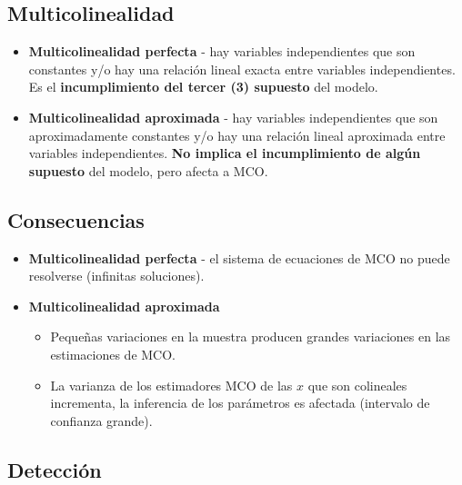 \documentclass[10pt, a4paper, landscape]{article}
\begin{document}
\begin{multicols}{3}
\columnbreak

\section*{Multicolinealidad}

\begin{itemize}[leftmargin=*]
	\item \textbf{Multicolinealidad perfecta} - hay variables independientes que son constantes y/o hay una relación lineal exacta entre variables independientes. Es el \textbf{incumplimiento del tercer (3) supuesto} del modelo.
	\item \textbf{Multicolinealidad aproximada} - hay variables independientes que son aproximadamente constantes y/o hay una relación lineal aproximada entre variables independientes. \textbf{No implica el incumplimiento de algún supuesto} del modelo, pero afecta a MCO.
\end{itemize}

\subsection*{Consecuencias}

\begin{itemize}[leftmargin=*]
	\item \textbf{Multicolinealidad perfecta} - el sistema de ecuaciones de MCO no puede resolverse (infinitas soluciones).
	\item \textbf{Multicolinealidad aproximada}
	\begin{itemize}[leftmargin=*]
		\item Pequeñas variaciones en la muestra producen grandes variaciones en las estimaciones de MCO.
		\item La varianza de los estimadores MCO de las \( x \) que son colineales incrementa, la inferencia de los parámetros es afectada (intervalo de confianza grande).
	\end{itemize}
\end{itemize}

\subsection*{Detección}


\end{multicols}
\end{document}
